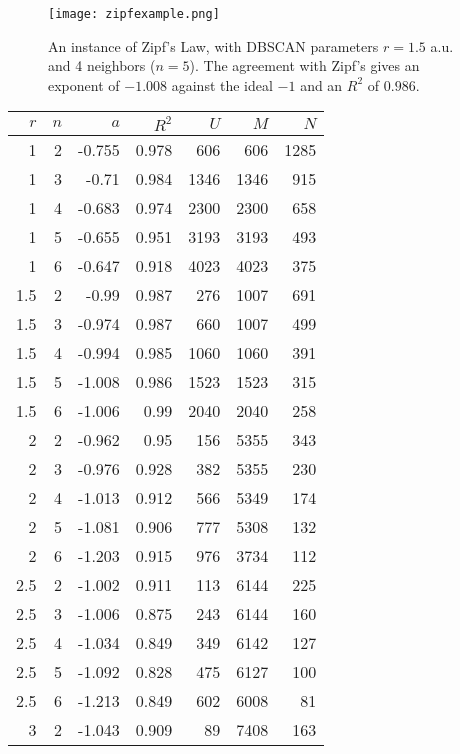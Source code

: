 \documentclass{article}
\begin{document}
\begin{figure}
  \centering
  \texttt{[image: zipfexample.png]}
  \caption{An instance of Zipf's Law, with DBSCAN parameters
    $r=1.5$ a.u. and 4 neighbors ($n=5$). The agreement with Zipf's
    gives an exponent of $-1.008$ against the ideal $-1$ and
    an $R^2$ of $0.986$.}
\end{figure}

\begin{table}
\begin{center}
  \begin{tabular}{|r|r||r|r|r|r|r|}
 $r$ &  $n$  & $a$ & $ R^2$ & $U$ & $M$ & $N$  \\ \hline 
  1 &  2 & -0.755 &  0.978 & 606 & 606 & 1285 \\
  1 &  3 & -0.71 &  0.984 & 1346 & 1346 & 915 \\
  1 &  4 & -0.683 &  0.974 & 2300 & 2300 & 658 \\
  1 &  5 & -0.655 &  0.951 & 3193 & 3193 & 493 \\
  1 &  6 & -0.647 &  0.918 & 4023 & 4023 & 375 \\
  1.5 &  2 & -0.99 &  0.987 & 276 & 1007 & 691 \\
  1.5 &  3 & -0.974 &  0.987 & 660 & 1007 & 499 \\
  1.5 &  4 & -0.994 &  0.985 & 1060 & 1060 & 391 \\
  1.5 &  5 & -1.008 &  0.986 & 1523 & 1523 & 315 \\
  1.5 &  6 & -1.006 &  0.99 & 2040 & 2040 & 258 \\
  2 &  2 & -0.962 &  0.95 & 156 & 5355 & 343 \\
  2 &  3 & -0.976 &  0.928 & 382 & 5355 & 230 \\
  2 &  4 & -1.013 &  0.912 & 566 & 5349 & 174 \\
  2 &  5 & -1.081 &  0.906 & 777 & 5308 & 132 \\
  2 &  6 & -1.203 &  0.915 & 976 & 3734 & 112 \\
  2.5 &  2 & -1.002 &  0.911 & 113 & 6144 & 225 \\
  2.5 &  3 & -1.006 &  0.875 & 243 & 6144 & 160 \\
  2.5 &  4 & -1.034 &  0.849 & 349 & 6142 & 127 \\
  2.5 &  5 & -1.092 &  0.828 & 475 & 6127 & 100 \\
  2.5 &  6 & -1.213 &  0.849 & 602 & 6008 & 81 \\
  3 &  2 & -1.043 &  0.909 & 89 & 7408 & 163 \\

\end{tabular}
\end{center}
\end{table}
\end{document}
